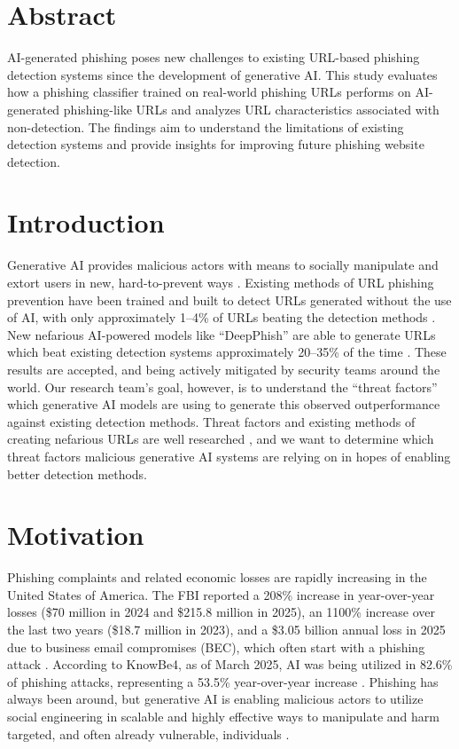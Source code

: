 \documentclass[sigconf]{acmart}
\begin{document}
\begin{bibunit}
\vspace{0.5em}
\section{Abstract}

AI-generated phishing poses new challenges to existing URL-based
phishing detection systems since the development of generative AI.
This study evaluates how a phishing classifier trained on real-world
phishing URLs performs on AI-generated phishing-like URLs and analyzes
URL characteristics associated with non-detection. The findings
aim to understand the limitations of existing detection systems and
provide insights for improving future phishing website detection.

\section{Introduction}
Generative AI provides malicious actors with means to socially manipulate
and extort users in new, hard-to-prevent ways \cite{pippig2025,freist2025}.
Existing methods of URL phishing prevention have been trained and built to
detect URLs generated without the use of AI, with only approximately
1--4\% of URLs beating the detection methods \cite{bahnsen2018deepphish}.
New nefarious AI-powered models like ``DeepPhish'' are able to generate
URLs which beat existing detection systems approximately 20--35\% of the
time \cite{bahnsen2018deepphish}. These results are accepted, and being
actively mitigated by security teams around the world. Our research team's
goal, however, is to understand the ``threat factors'' which generative AI
models are using to generate this observed outperformance against existing
detection methods. Threat factors and existing methods of creating
nefarious URLs are well researched \cite{kustiawan2025,li2024}, and we
want to determine which threat factors malicious generative AI systems are
relying on in hopes of enabling better detection methods.
\section{Motivation}
Phishing complaints and related economic losses are rapidly increasing in the United States of America. The FBI reported a 208\% increase in year-over-year losses (\$70 million in 2024 and \$215.8 million in 2025), an 1100\% increase over the last two years (\$18.7 million in 2023), and a \$3.05 billion annual loss in 2025 due to business email compromises (BEC), which often start with a phishing attack \cite{axis2026}. According to KnowBe4, as of March 2025, AI was being utilized in 82.6\% of phishing attacks, representing a 53.5\% year-over-year increase \cite{bay2025}. Phishing has always been around, but generative AI is enabling malicious actors to utilize social engineering in scalable and highly effective ways to manipulate and harm targeted, and often already vulnerable, individuals \cite{schmitt2024,begou2023}.


\end{bibunit}
\end{document}
